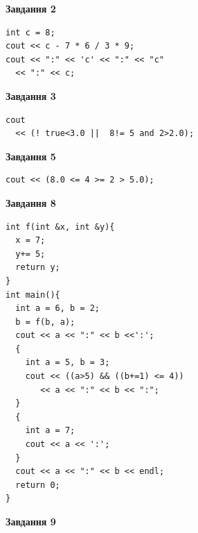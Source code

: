 \documentclass[12pt, ukrainian]{article}
\begin{document}
{\begin {large}
\begin{minipage}[t]{7.0cm}
\end{minipage}
\vline \hspace{1mm}
\begin{minipage}[t]{11.0cm}

\begin{center}
\textbf{Завдання 2}
\end{center}
\vspace{-8mm}

\begin{verbatim}
int c = 8;
cout << c - 7 * 6 / 3 * 9;
cout << ":" << 'c' << ":" << "c" 
  << ":" << c;
\end{verbatim}



\begin{center}
\textbf{Завдання 3}
\end{center}
\vspace{-8mm}

\begin{verbatim}
cout 
  << (! true<3.0 ||  8!= 5 and 2>2.0);
\end{verbatim}



\begin{center}
\textbf{Завдання 5}
\end{center}
\vspace{-8mm}

\begin{verbatim}
cout << (8.0 <= 4 >= 2 > 5.0);
\end{verbatim}



\begin{center}
\textbf{Завдання 8}
\end{center}
\vspace{-8mm}

\begin{verbatim}
int f(int &x, int &y){
  x = 7;
  y+= 5;
  return y;
}
int main(){
  int a = 6, b = 2;
  b = f(b, a);
  cout << a << ":" << b <<':';
  {
    int a = 5, b = 3;
    cout << ((a>5) && ((b+=1) <= 4))
       << a << ":" << b << ":";
  }
  {
    int a = 7;
    cout << a << ':';
  }
  cout << a << ":" << b << endl;
  return 0;
}
\end{verbatim}

\end{minipage}


\begin{minipage}[t]{7.0cm}

\begin{center}
\textbf{Завдання 9}
\end{center}
\vspace{-8mm}


\end{minipage}
\end{large}}
\end{document}
